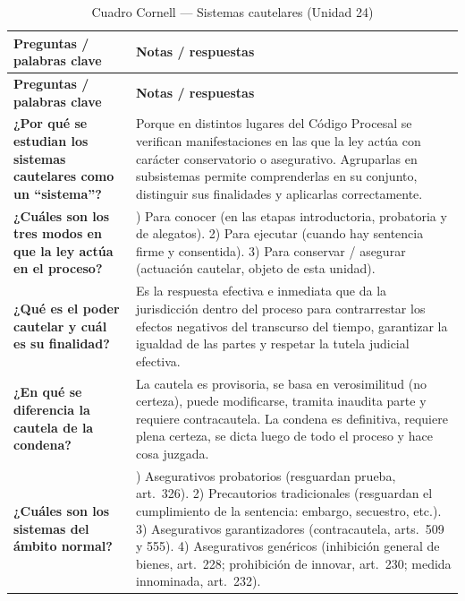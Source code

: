 \documentclass[12pt,oneside]{book}
\begin{document}
\begin{longtable}{
    >{\raggedright\arraybackslash}p{}
    >{\raggedright\arraybackslash}p{}
}
\caption{Cuadro Cornell --- Sistemas cautelares (Unidad 24)} \\
\toprule
\textbf{Preguntas / palabras clave} & \textbf{Notas / respuestas} \\
\midrule
\endfirsthead
\toprule
\textbf{Preguntas / palabras clave} & \textbf{Notas / respuestas} \\
\midrule
\endhead
\bottomrule
\endfoot

\textbf{¿Por qué se estudian los sistemas cautelares como un ``sistema''?} &
Porque en distintos lugares del Código Procesal se verifican manifestaciones en las que la ley actúa con carácter conservatorio o asegurativo. Agruparlas en subsistemas permite comprenderlas en su conjunto, distinguir sus finalidades y aplicarlas correctamente. \\

\textbf{¿Cuáles son los tres modos en que la ley actúa en el proceso?} &
1) Para conocer (en las etapas introductoria, probatoria y de alegatos). 2) Para ejecutar (cuando hay sentencia firme y consentida). 3) Para conservar / asegurar (actuación cautelar, objeto de esta unidad). \\

\textbf{¿Qué es el poder cautelar y cuál es su finalidad?} &
Es la respuesta efectiva e inmediata que da la jurisdicción dentro del proceso para contrarrestar los efectos negativos del transcurso del tiempo, garantizar la igualdad de las partes y respetar la tutela judicial efectiva. \\

\textbf{¿En qué se diferencia la cautela de la condena?} &
La cautela es provisoria, se basa en verosimilitud (no certeza), puede modificarse, tramita inaudita parte y requiere contracautela. La condena es definitiva, requiere plena certeza, se dicta luego de todo el proceso y hace cosa juzgada. \\

\textbf{¿Cuáles son los sistemas del ámbito normal?} &
1) Asegurativos probatorios (resguardan prueba, art.\ 326). 2) Precautorios tradicionales (resguardan el cumplimiento de la sentencia: embargo, secuestro, etc.). 3) Asegurativos garantizadores (contracautela, arts.\ 509 y 555). 4) Asegurativos genéricos (inhibición general de bienes, art.\ 228; prohibición de innovar, art.\ 230; medida innominada, art.\ 232). \\


\end{longtable}
\end{document}
